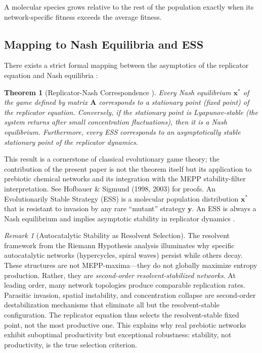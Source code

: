 \documentclass[12pt,a4paper]{article}
\newtheorem{theorem}{Theorem}
\theoremstyle{remark}
\newtheorem{remark}{Remark}
\begin{document}
A molecular species grows relative to the rest of the population exactly when its network-specific fitness exceeds the average fitness.

\subsection{Mapping to Nash Equilibria and ESS}

There exists a strict formal mapping between the asymptotics of the replicator equation and Nash equilibria \citep{ReplicatorEntropy}:

\begin{theorem}[Replicator-Nash Correspondence {\citep{HofbauerSigmund2003,HofbauerSigmund1998}}]
\label{thm:replicator-nash}
Every Nash equilibrium $\mathbf{x}^*$ of the game defined by matrix $\mathbf{A}$ corresponds to a stationary point (fixed point) of the replicator equation. Conversely, if the stationary point is Lyapunov-stable (the system returns after small concentration fluctuations), then it is a Nash equilibrium. Furthermore, every ESS corresponds to an asymptotically stable stationary point of the replicator dynamics.
\end{theorem}

This result is a cornerstone of classical evolutionary game theory; the contribution of the present paper is not the theorem itself but its application to prebiotic chemical networks and its integration with the MEPP stability-filter interpretation. See Hofbauer \& Sigmund (1998, 2003) for proofs. An Evolutionarily Stable Strategy (ESS) is a molecular population distribution $\mathbf{x}^*$ that is resistant to invasion by any rare ``mutant'' strategy $\mathbf{y}$. An ESS is always a Nash equilibrium and implies asymptotic stability in replicator dynamics \citep{HofbauerSigmund1998}.

\begin{remark}[Autocatalytic Stability as Resolvent Selection]
\label{rem:autocatalysis-resolvent}
The resolvent framework from the Riemann Hypothesis analysis \citep{GeigerRH2026b} illuminates why specific autocatalytic networks (hypercycles, spiral waves) persist while others decay. These structures are not MEPP-maxima---they do not globally maximize entropy production. Rather, they are \emph{second-order resolvent-stabilized networks}. At leading order, many network topologies produce comparable replication rates. Parasitic invasion, spatial instability, and concentration collapse are second-order destabilization mechanisms that eliminate all but the resolvent-stable configuration. The replicator equation thus selects the resolvent-stable fixed point, not the most productive one. This explains why real prebiotic networks exhibit suboptimal productivity but exceptional robustness: stability, not productivity, is the true selection criterion.
\end{remark}
\end{document}
